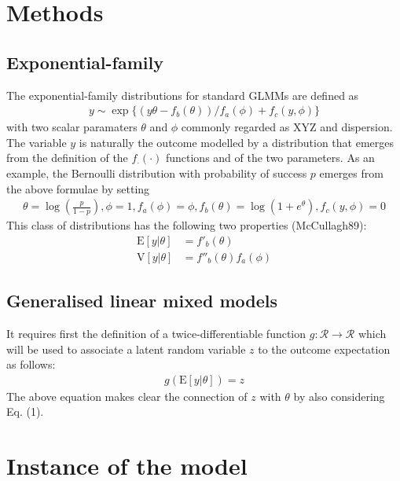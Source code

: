 \section{Methods}

\subsection{Exponential-family}

The exponential-family distributions for standard GLMMs are defined as
\begin{align*}
  y \sim \exp\{(y\theta - f_b(\theta))/f_a(\phi) + f_c(y, \phi)\}
\end{align*}
with two scalar paramaters $\theta$ and $\phi$ commonly regarded as XYZ and
dispersion.
The variable $y$ is naturally the outcome modelled by a distribution that
emerges from the definition of the $f_{\cdot}(\cdot)$ functions and of the two
parameters. As an example, the Bernoulli distribution with probability of
success $p$ emerges from the above formulae by setting
\begin{align*}
  \theta = \log\left(\frac{p}{1-p}\right), \phi = 1, f_a(\phi) = \phi,
	f_b(\theta)=\log(1+e^\theta), f_c(y, \phi) = 0
\end{align*}
This class of distributions has the following two properties (McCullagh89):
\begin{align*}
  \mathrm E[y|\theta] &= f'_b(\theta)\\
  \mathrm V[y|\theta] &= f''_b(\theta) f_a(\phi)
\end{align*}

\subsection{Generalised linear mixed models}

It requires first the definition of a twice-differentiable function
$g:\mathcal R \rightarrow \mathcal R$ which will be used to associate a latent
random variable $z$ to the outcome expectation as follows:
\begin{align*}
  g(\mathrm E[y|\theta]) = z
\end{align*}
The above equation makes clear the connection of $z$ with $\theta$ by also
considering Eq. (1).

\section{Instance of the model}

